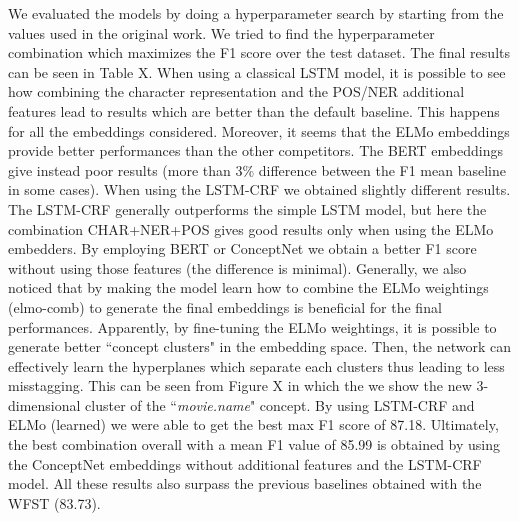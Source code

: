 \documentclass[11pt,a4paper]{article}
\begin{document}
We evaluated the models by doing a hyperparameter search by starting from the values used in the original work. We tried to find the hyperparameter combination which maximizes the F1 score over the test dataset. The final results can be seen in Table X.
When using a classical LSTM model, it is possible to see how combining the character representation and the POS/NER additional features lead to results which are better than the default baseline. This happens for all the embeddings considered. Moreover, it seems that the ELMo embeddings provide better performances than the other competitors. 
The BERT embeddings give instead poor results (more than 3\% difference between the F1 mean baseline in some cases).
When using the LSTM-CRF we obtained slightly different results. The LSTM-CRF generally outperforms the simple LSTM model, but here the combination CHAR+NER+POS gives good results only when using the ELMo embedders. By employing BERT or ConceptNet we obtain a better F1 score without using those features (the difference is minimal).
Generally, we also noticed that by making the model learn how to combine the ELMo weightings (elmo-comb) to generate the final embeddings is beneficial for the final performances. Apparently, by fine-tuning the ELMo weightings, it is possible to generate better ``concept clusters" in the embedding space.  Then, the network can effectively learn the hyperplanes which separate each clusters thus leading to less misstagging. This can be seen from Figure X in which the we show the new 3-dimensional cluster of the ``\textit{movie.name}" concept. 
By using LSTM-CRF and ELMo (learned) we were able to get the best max F1 score of 87.18. Ultimately, the best combination overall with a mean F1 value of  85.99 is obtained by using the ConceptNet embeddings without additional features and the LSTM-CRF model. All these results also surpass the previous baselines obtained with the WFST (83.73).
\end{document}
